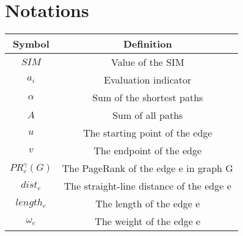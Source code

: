 \section{Notations}
\begin{table}[H]
	\begin{center}
		\begin{tabular}{cc}
			\toprule[1.5pt]
			Symbol&Definition\\
			\midrule[1pt]
			\(SIM\)&Value of the SIM\\
			\(a_i\)&Evaluation indicator\\
			\(\alpha\)& Sum of the shortest paths\\
			\(A\)& Sum of all paths\\
			\({u}\)&The starting point of the edge\\
			\({v}\)&The endpoint of the edge\\
			\({PR_e^{\gamma}(G)}\)&The PageRank of the edge e in graph G\\
			\(dist_e\)&The straight-line distance of the edge e\\
			\(length_e\)&The length of the edge e\\
			\(\omega_e\)&The weight of the edge e\\
			\bottomrule[1.5pt]
		\end{tabular}
	\end{center}
\end{table}